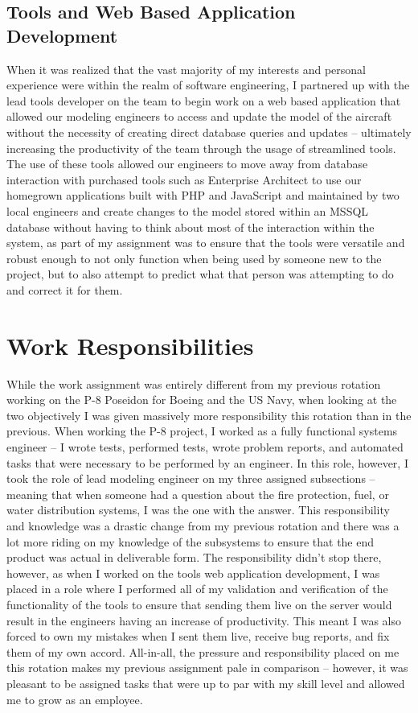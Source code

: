 \documentclass{article}
\begin{document}
\subsection{Tools and Web Based Application Development}
When it was realized that the vast majority of my interests and personal experience were within the realm of software engineering, I partnered up with the lead tools developer on the team to begin work on a web based application that allowed our modeling engineers to access and update the model of the aircraft without the necessity of creating direct database queries and updates -- ultimately increasing the productivity of the team through the usage of streamlined tools.
The use of these tools allowed our engineers to move away from database interaction with purchased tools such as Enterprise Architect to use our homegrown applications built with PHP and JavaScript and maintained by two local engineers and create changes to the model stored within an MSSQL database without having to think about most of the interaction within the system, as part of my assignment was to ensure that the tools were versatile and robust enough to not only function when being used by someone new to the project, but to also attempt to predict what that person was attempting to do and correct it for them.


\section{Work Responsibilities}
While the work assignment was entirely different from my previous rotation working on the P-8 Poseidon for Boeing and the US Navy, when looking at the two objectively I was given massively more responsibility this rotation than in the previous. 
When working the P-8 project, I worked as a fully functional systems engineer -- I wrote tests, performed tests, wrote problem reports, and automated tasks that were necessary to be performed by an engineer. 
In this role, however, I took the role of lead modeling engineer on my three assigned subsections -- meaning that when someone had a question about the fire protection, fuel, or water distribution systems, I was the one with the answer.
This responsibility and knowledge was a drastic change from my previous rotation and there was a lot more riding on my knowledge of the subsystems to ensure that the end product was actual in deliverable form.
The responsibility didn't stop there, however, as when I worked on the tools web application development, I was placed in a role where I performed all of my validation and verification of the functionality of the tools to ensure that sending them live on the server would result in the engineers having an increase of productivity.
This meant I was also forced to own my mistakes when I sent them live, receive bug reports, and fix them of my own accord.
All-in-all, the pressure and responsibility placed on me this rotation makes my previous assignment pale in comparison -- however, it was pleasant to be assigned tasks that were up to par with my skill level and allowed me to grow as an employee.
\end{document}
